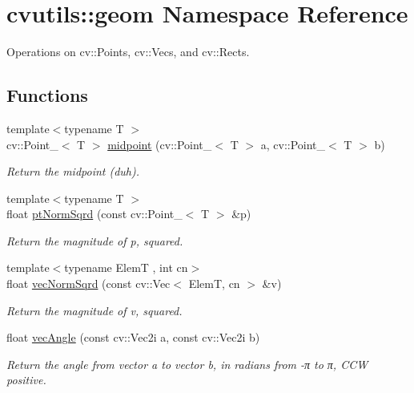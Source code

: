 \hypertarget{namespacecvutils_1_1geom}{\section{cvutils\-:\-:geom Namespace Reference}
\label{namespacecvutils_1_1geom}
}


Operations on {\ttfamily cv\-::\-Point}s, {\ttfamily cv\-::\-Vec}s, and {\ttfamily cv\-::\-Rect}s.  


\subsection*{Functions}
\begin{DoxyCompactItemize}
\item 
{\footnotesize template$<$typename T $>$ }\\cv\-::\-Point\-\_\-$<$ T $>$ \hyperlink{namespacecvutils_1_1geom_a6a1ce8e52ffaec2a0b1f4a05a2e9a52a}{midpoint} (cv\-::\-Point\-\_\-$<$ T $>$ a, cv\-::\-Point\-\_\-$<$ T $>$ b)
\begin{DoxyCompactList}\small\item\em Return the midpoint (duh). \end{DoxyCompactList}\item 
{\footnotesize template$<$typename T $>$ }\\float \hyperlink{namespacecvutils_1_1geom_a8d1d619355d2606b616341a63c0fee97}{pt\-Norm\-Sqrd} (const cv\-::\-Point\-\_\-$<$ T $>$ \&p)
\begin{DoxyCompactList}\small\item\em Return the magnitude of {\ttfamily p}, squared. \end{DoxyCompactList}\item 
{\footnotesize template$<$typename Elem\-T , int cn$>$ }\\float \hyperlink{namespacecvutils_1_1geom_ab5fea22f416b23e22a2391595b06a91c}{vec\-Norm\-Sqrd} (const cv\-::\-Vec$<$ Elem\-T, cn $>$ \&v)
\begin{DoxyCompactList}\small\item\em Return the magnitude of {\ttfamily v}, squared. \end{DoxyCompactList}\item 
float \hyperlink{namespacecvutils_1_1geom_a74f28d175b207918e4fc60149e147dba}{vec\-Angle} (const cv\-::\-Vec2i a, const cv\-::\-Vec2i b)
\begin{DoxyCompactList}\small\item\em Return the angle from vector {\ttfamily a} to vector {\ttfamily b}, in radians from -\/π to π, C\-C\-W positive. \end{DoxyCompactList}\item 

\end{DoxyCompactItemize}
